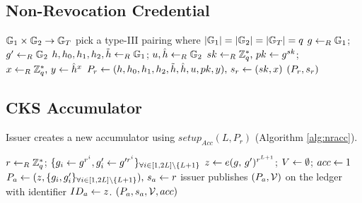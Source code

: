 \documentclass{article}
\begin{document}
\subsection{Non-Revocation Credential}
\begin{algorithm}
\caption{$setup_{NR}()$}
\label{alg:nrsetup}
\begin{algorithmic}
	\State $\mathbb{G}_{1}\times \mathbb{G}_{2} \rightarrow \mathbb{G}_{T}$
	\Comment pick a type-III pairing where $|\mathbb{G}_{1}|=|\mathbb{G}_{2}|=|\mathbb{G}_{T}|=q$
	\State $g\leftarrow _{R} \mathbb{G}_{1}$; $g'\leftarrow _{R} \mathbb{G}_{2}$
	\State $h, h_0, h_1, h_2, \tilde{h}\leftarrow _{R} \mathbb{G}_{1}$; $u, \hat{h}\leftarrow _{R} \mathbb{G}_{2}$
	\State $sk\leftarrow _{R} \mathbb{Z}_{q}^{*}\mbox{, }pk\leftarrow g^{sk}$; $x\leftarrow _{R} \mathbb{Z}_{q}^{*}\mbox{, }y\leftarrow \hat{h}^{x}$
	\State $P_{r}\leftarrow {(h, h_0, h_1, h_2, \tilde{h}, \hat{h}, u, pk, y)}\mbox{, }s_{r}\leftarrow {(sk, x)}$
	\State \Return $(P_{r}, s_{r})$
\end{algorithmic}
\end{algorithm}
\subsection{CKS Accumulator}
Issuer creates a new accumulator using $setup_{Acc}(L, P_{r})$ (Algorithm \ref{alg:nracc}).
\begin{algorithm}
\caption{$setup_{Acc}(L, P_{r})$}
\label{alg:nracc}
\begin{algorithmic}
	\State $r\leftarrow _{R} \mathbb{Z}_{q}^{*}$; $\{g_{i}\leftarrow g^{r^{i}}, g'_{i}\leftarrow g'^{r^{i}}\}_{\forall i\in [1, 2L] \backslash \{L + 1\}}$
	\State $z\leftarrow e(g\mbox{, }g')^{r^{L + 1}}$; $V\leftarrow \emptyset$; $acc\leftarrow 1$
	\State $P_{a}\leftarrow {(z, \{g_{i}, g'_{i}\}_{\forall i\in [1, 2L] \backslash \{L + 1\}})}\mbox{, }s_{a}\leftarrow {r}$
	\State \Comment issuer publishes $(P_{a}, \mathcal{V})$ on the ledger with identifier $ID_{a} \leftarrow z$.
	\State \Return $(P_{a}, s_{a}, \mathcal{V}, acc)$
\end{algorithmic}
\end{algorithm}
\end{document}
